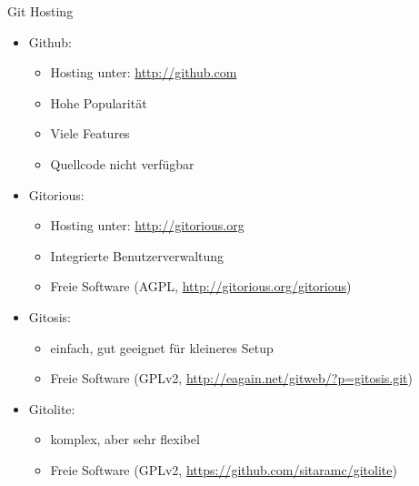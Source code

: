 \begin{frame}[allowframebreaks]{Git Hosting}
  \begin{itemize}
    \item Github:
    \begin{itemize}
      \item Hosting unter: \url{http://github.com}
      \item Hohe Popularität
      \item Viele Features
      \item Quellcode nicht verfügbar
    \end{itemize}
    \item Gitorious:
    \begin{itemize}
      \item Hosting unter: \url{http://gitorious.org}
      \item Integrierte Benutzerverwaltung
      \item Freie Software (AGPL, \url{http://gitorious.org/gitorious})
    \end{itemize}
  \framebreak
    \item Gitosis:
    \begin{itemize}
      \item einfach, gut geeignet für kleineres Setup
      \item Freie Software (GPLv2, \url{http://eagain.net/gitweb/?p=gitosis.git})
    \end{itemize}
    \item Gitolite:
    \begin{itemize}
      \item komplex, aber sehr flexibel 
      \item Freie Software (GPLv2, \url{https://github.com/sitaramc/gitolite})
    \end{itemize}
  \end{itemize}
\end{frame}

